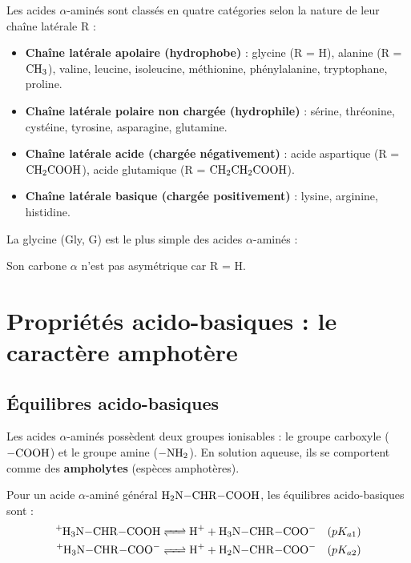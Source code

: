 \begin{propriete}
Les acides $\alpha$-aminés sont classés en quatre catégories selon la nature de leur chaîne latérale R :
\begin{itemize}
    \item \textbf{Chaîne latérale apolaire (hydrophobe)} : glycine (R = H), alanine (R = $\ce{CH3}$), valine, leucine, isoleucine, méthionine, phénylalanine, tryptophane, proline.
    \item \textbf{Chaîne latérale polaire non chargée (hydrophile)} : sérine, thréonine, cystéine, tyrosine, asparagine, glutamine.
    \item \textbf{Chaîne latérale acide (chargée négativement)} : acide aspartique (R = $\ce{CH2COOH}$), acide glutamique (R = $\ce{CH2CH2COOH}$).
    \item \textbf{Chaîne latérale basique (chargée positivement)} : lysine, arginine, histidine.
\end{itemize}
\end{propriete}

\begin{exemple}
La glycine (Gly, G) est le plus simple des acides $\alpha$-aminés :
\begin{center}
\end{center}
Son carbone $\alpha$ n'est pas asymétrique car R = H.
\end{exemple}

\section{Propriétés acido-basiques : le caractère amphotère}

\subsection{Équilibres acido-basiques}

Les acides $\alpha$-aminés possèdent deux groupes ionisables : le groupe carboxyle ($\ce{-COOH}$) et le groupe amine ($\ce{-NH2}$). En solution aqueuse, ils se comportent comme des \textbf{ampholytes} (espèces amphotères).

\begin{loi}
Pour un acide $\alpha$-aminé général $\ce{H2N-CHR-COOH}$, les équilibres acido-basiques sont :
\begin{align}
\ce{^{+}H3N-CHR-COOH &<=> H+ + H3N-CHR-COO-} \quad (pK_{a1}) \\
\ce{^{+}H3N-CHR-COO- &<=> H+ + H2N-CHR-COO-} \quad (pK_{a2})
\end{align}
\end{loi}

